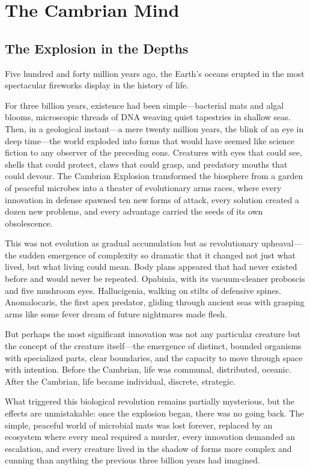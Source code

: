 \chapter{The Cambrian Mind}

\section{The Explosion in the Depths}

Five hundred and forty million years ago, the Earth's oceans erupted in the most spectacular fireworks display in the history of life.

For three billion years, existence had been simple—bacterial mats and algal blooms, microscopic threads of DNA weaving quiet tapestries in shallow seas. Then, in a geological instant—a mere twenty million years, the blink of an eye in deep time—the world exploded into forms that would have seemed like science fiction to any observer of the preceding eons. Creatures with eyes that could see, shells that could protect, claws that could grasp, and predatory mouths that could devour. The Cambrian Explosion transformed the biosphere from a garden of peaceful microbes into a theater of evolutionary arms races, where every innovation in defense spawned ten new forms of attack, every solution created a dozen new problems, and every advantage carried the seeds of its own obsolescence.

This was not evolution as gradual accumulation but as revolutionary upheaval—the sudden emergence of complexity so dramatic that it changed not just what lived, but what living could mean. Body plans appeared that had never existed before and would never be repeated. Opabinia, with its vacuum-cleaner proboscis and five mushroom eyes. Hallucigenia, walking on stilts of defensive spines. Anomalocaris, the first apex predator, gliding through ancient seas with grasping arms like some fever dream of future nightmares made flesh.

But perhaps the most significant innovation was not any particular creature but the concept of the creature itself—the emergence of distinct, bounded organisms with specialized parts, clear boundaries, and the capacity to move through space with intention. Before the Cambrian, life was communal, distributed, oceanic. After the Cambrian, life became individual, discrete, strategic.

What triggered this biological revolution remains partially mysterious, but the effects are unmistakable: once the explosion began, there was no going back. The simple, peaceful world of microbial mats was lost forever, replaced by an ecosystem where every meal required a murder, every innovation demanded an escalation, and every creature lived in the shadow of forms more complex and cunning than anything the previous three billion years had imagined.

